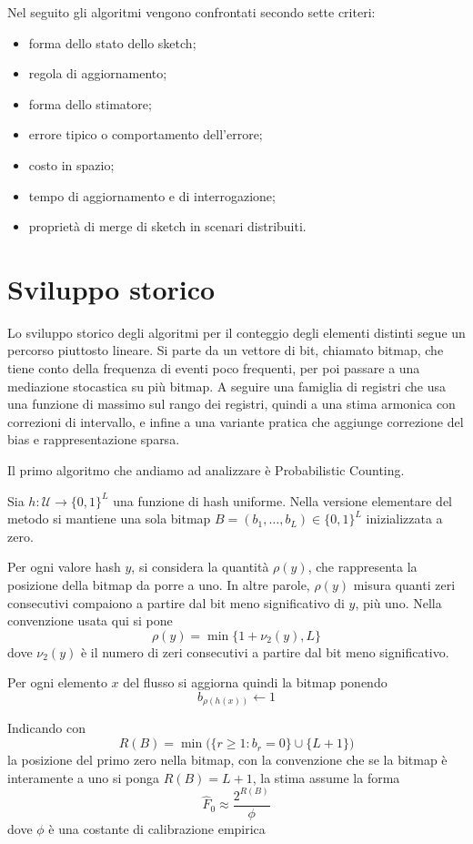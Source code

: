 Nel seguito gli algoritmi vengono confrontati secondo sette criteri:
\begin{itemize}
    \item forma dello stato dello sketch;
    \item regola di aggiornamento;
    \item forma dello stimatore;
    \item errore tipico o comportamento dell'errore;
    \item costo in spazio;
    \item tempo di aggiornamento e di interrogazione;
    \item proprietà di merge di sketch in scenari distribuiti.
\end{itemize}

\section{Sviluppo storico}
Lo sviluppo storico degli algoritmi per il conteggio degli elementi distinti segue un percorso
piuttosto lineare. Si parte da un vettore di bit, chiamato bitmap, che tiene conto della
frequenza di eventi poco frequenti, per poi passare
a una mediazione stocastica su più bitmap. A seguire una famiglia di registri
che usa una funzione di massimo sul rango dei registri, quindi a una stima armonica con correzioni di intervallo,
e infine a una variante pratica che aggiunge correzione del bias e
rappresentazione sparsa.

Il primo algoritmo che andiamo ad analizzare è Probabilistic Counting.

\begin{definition}
  Sia $h:\mathcal{U}\rightarrow\{0,1\}^{L}$ una funzione di hash uniforme. Nella
  versione elementare del metodo si mantiene una sola bitmap
  $B=(b_1,\dots,b_L)\in\{0,1\}^{L}$ inizializzata a zero.

  Per ogni valore hash $y$, si considera la quantità $\rho(y)$, che rappresenta
  la posizione della bitmap da porre a uno. In altre parole, $\rho(y)$ misura
  quanti zeri consecutivi compaiono a partire dal bit meno significativo di $y$,
  più uno. Nella convenzione usata qui si pone
  \[
  \rho(y)=\min\{1+\nu_2(y),L\}
  \]
  dove $\nu_2(y)$ è il numero di zeri consecutivi a partire dal bit meno
  significativo.

  Per ogni elemento $x$ del flusso si aggiorna quindi la bitmap ponendo
  \[
  b_{\rho(h(x))}\leftarrow 1
  \]

  Indicando con
  \[
  R(B)=\min\bigl(\{r\geq 1 : b_r=0\}\cup\{L+1\}\bigr)
  \]
  la posizione del primo zero nella bitmap, con la convenzione che se la bitmap è
  interamente a uno si ponga $R(B)=L+1$, la stima assume la forma
  \[
  \hat{F}_0 \approx \frac{2^{R(B)}}{\phi}
  \]
  dove $\phi$ è una costante di calibrazione empirica
  \cite{Flajolet_Martin_1985}
  \end{definition}

